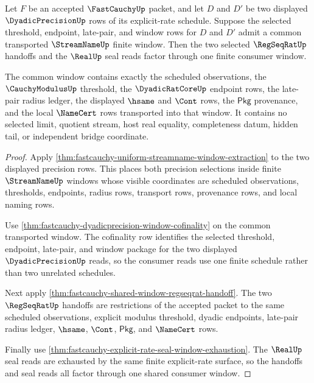 \begin{theorem}
\label{thm:fastcauchy-common-precision-window-connector}
Let $F$ be an accepted $\FastCauchyUp$ packet, and let $D$ and $D'$ be two
displayed $\DyadicPrecisionUp$ rows of its explicit-rate schedule. Suppose the
selected threshold, endpoint, late-pair, and window rows for $D$ and $D'$ admit
a common transported $\StreamNameUp$ finite window. Then the two selected
$\RegSeqRatUp$ handoffs and the $\RealUp$ seal reads factor through one finite
consumer window.

The common window contains exactly the scheduled observations, the
$\CauchyModulusUp$ threshold, the $\DyadicRatCoreUp$ endpoint rows, the
late-pair radius ledger, the displayed $\hsame$ and $\Cont$ rows, the
$\mathsf{Pkg}$ provenance, and the local $\NameCert$ rows transported into that
window. It contains no selected limit, quotient stream, host real equality,
completeness datum, hidden tail, or independent bridge coordinate.
\end{theorem}
\begin{proof}
Apply \autoref{thm:fastcauchy-uniform-streamname-window-extraction} to the two
displayed precision rows. This places both precision selections inside finite
$\StreamNameUp$ windows whose visible coordinates are scheduled observations,
thresholds, endpoints, radius rows, transport rows, provenance rows, and local
naming rows.

Use \autoref{thm:fastcauchy-dyadicprecision-window-cofinality} on the common
transported window. The cofinality row identifies the selected threshold,
endpoint, late-pair, and window package for the two displayed
$\DyadicPrecisionUp$ reads, so the consumer reads use one finite schedule
rather than two unrelated schedules.

Next apply \autoref{thm:fastcauchy-shared-window-regseqrat-handoff}. The two
$\RegSeqRatUp$ handoffs are restrictions of the accepted packet to the same
scheduled observations, explicit modulus threshold, dyadic endpoints,
late-pair radius ledger, $\hsame$, $\Cont$, $\mathsf{Pkg}$, and $\NameCert$
rows.

Finally use \autoref{thm:fastcauchy-explicit-rate-seal-window-exhaustion}. The
$\RealUp$ seal reads are exhausted by the same finite explicit-rate surface,
so the handoffs and seal reads all factor through one shared consumer window.
\end{proof}


